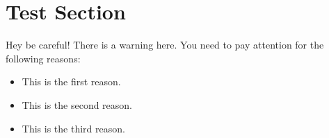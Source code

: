 \documentclass[../main.tex]{subfiles}
\begin{document}
\section{Test Section}

\blindtext

\begin{testwarning}
	Hey be careful!
	There is a warning here. You need to pay attention for the following reasons:
	\begin{itemize}
		\item This is the first reason.
		\item This is the second reason.
		\item This is the third reason.
	\end{itemize}
\end{testwarning}

\blindtext

\begin{testbox2}
	\blindtext
\end{testbox2}

\blindtext

\begin{testbox4}
	\blindtext
\end{testbox4}











\end{document}
